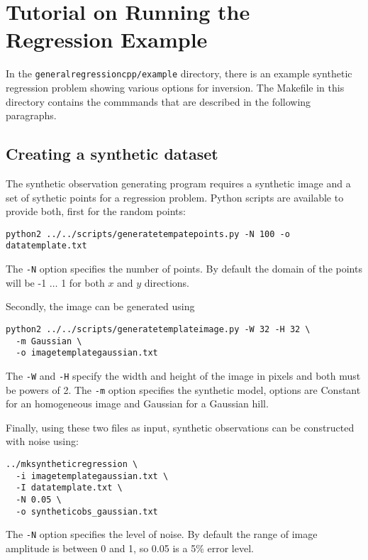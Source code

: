 \documentclass[a4paper,12pt]{article}
\begin{document}
\section{Tutorial on Running the Regression Example}

In the {\tt generalregressioncpp/example} directory, there is an example
synthetic regression problem showing various options for inversion.
The Makefile in this directory contains the commmands that are described
in the following paragraphs.

\subsection{Creating a synthetic dataset}

The synthetic observation generating program requires a synthetic
image and a set of sythetic points for a regression problem. Python scripts
are available to provide both, first for the random points:

\begin{verbatim}
python2 ../../scripts/generatetempatepoints.py -N 100 -o datatemplate.txt
\end{verbatim}

The {\tt -N} option specifies the number of points. By default the domain
of the points will be -1 $\ldots$ 1 for both $x$ and $y$ directions.

Secondly, the image can be generated using

\begin{verbatim}
python2 ../../scripts/generatetemplateimage.py -W 32 -H 32 \
  -m Gaussian \
  -o imagetemplategaussian.txt
\end{verbatim}

The {\tt -W} and {\tt -H} specify the width and height of the image in pixels
and both must be powers of 2. The {\tt -m} option specifies the synthetic
model, options are Constant for an homogeneous image and Gaussian for a Gaussian
hill.

Finally, using these two files as input, synthetic observations can be constructed
with noise using:

\begin{verbatim}
../mksyntheticregression \
  -i imagetemplategaussian.txt \
  -I datatemplate.txt \
  -N 0.05 \
  -o syntheticobs_gaussian.txt
\end{verbatim}

The {\tt -N} option specifies the level of noise. By default the range of image
amplitude is between 0 and 1, so 0.05 is a 5\% error level.
\end{document}
